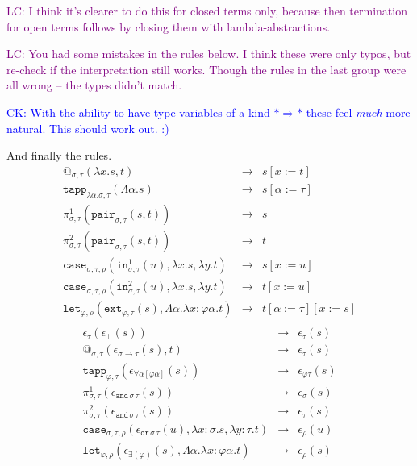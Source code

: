 \documentclass[runningheads,a4paper]{llncs}
\newcommand{\quant}[2]{\forall #1[#2]}
\newcommand{\red}{\longrightarrow}
\newcommand{\arrtype}{\rightarrow}
\newcommand{\arrkind}{\Rightarrow}
\newcommand{\abs}[2]{\lambda #1.#2}
\newcommand{\tabs}[2]{\Lambda #1.#2}
\newcommand{\CK}[1]{\textcolor{blue}{CK: #1}}
\newcommand{\LC}[1]{\textcolor{purple}{LC: #1}}
\begin{document}
\LC{I think it's clearer to do this for closed terms only,
  because then termination for open terms follows by closing them with
  lambda-abstractions.}

\LC{You had some mistakes in the rules below. I think these were only
  typos, but re-check if the interpretation still works. Though the
  rules in the last group were all wrong -- the types didn't match.}

\CK{With the ability to have type variables of a kind $* \arrkind *$
  these feel \emph{much} more natural.  This should work out. :)}

And finally the rules.
\[
\begin{array}{rcl}
@_{\sigma,\tau}(\abs{x}{s},t) & \red & s[x:=t] \\
\mathtt{tapp}_{\abs{\alpha}{\sigma},\tau}(\tabs{\alpha}{s}) & \red &
  s[\alpha:=\tau] \\
\pi^1_{\sigma,\tau}(\mathtt{pair}_{\sigma,\tau}(s,t)) & \red & s \\
\pi^2_{\sigma,\tau}(\mathtt{pair}_{\sigma,\tau}(s,t)) & \red & t \\
\mathtt{case}_{\sigma,\tau,\rho}(\mathtt{in}^1_{\sigma,\tau}(u),
  \abs{x}{s},\abs{y}{t}) & \red & s[x:=u] \\
\mathtt{case}_{\sigma,\tau,\rho}(\mathtt{in}^2_{\sigma,\tau}(u),
  \abs{x}{s},\abs{y}{t}) & \red & t[x:=u] \\
\mathtt{let}_{\varphi,\rho}(\mathtt{ext}_{\varphi,\tau}(s),\tabs{\alpha}{\abs{x:\varphi \alpha}{t}}) & \red & t[\alpha:=\tau][x:=s] \\
\end{array}
\]
\[
\begin{array}{rcl}
\epsilon_\tau(\epsilon_\bot(s)) & \red & \epsilon_\tau(s) \\
@_{\sigma,\tau}(\epsilon_{\sigma \arrtype \tau}(s),t) & \red &
  \epsilon_\tau(s) \\
\mathtt{tapp}_{\varphi,\tau}(
  \epsilon_{\quant{\alpha}{\varphi\alpha}}(s)) & \red &
  \epsilon_{\varphi\tau}(s) \\
\pi^1_{\sigma,\tau}(\epsilon_{\mathtt{and}\,\sigma\,\tau}(s)) & \red &
  \epsilon_\sigma(s) \\
\pi^2_{\sigma,\tau}(\epsilon_{\mathtt{and}\,\sigma\,\tau}(s)) & \red &
  \epsilon_\tau(s) \\
\mathtt{case}_{\sigma,\tau,\rho}(\epsilon_{\mathtt{or}\,\sigma\,\tau}(
  u),\abs{x:\sigma}{s},\abs{y:\tau}{t}) & \red & \epsilon_\rho(u) \\
\mathtt{let}_{\varphi,\rho}(\epsilon_{\exists(\varphi)}(s),\tabs{\alpha}{\abs{x:\varphi\alpha}{t}}) & \red &
  \epsilon_\rho(s) \\
\end{array}
\]
\end{document}
